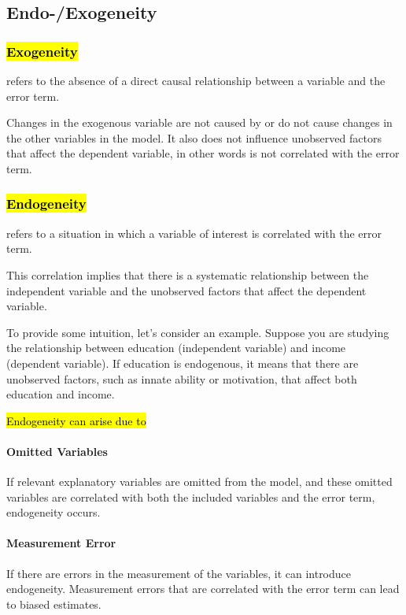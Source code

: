 \documentclass[a3paper, 8pt]{extarticle}
\begin{document}
\begin{multicols*}{5}
\subsection{Endo-/Exogeneity}


\subsubsection{\hl{Exogeneity}}
 refers to the absence of a direct causal relationship between a variable and the error term.

Changes in the exogenous variable are not caused by or do not cause changes in the other variables in the model. It also does not influence unobserved factors that affect the dependent variable, in other words is not correlated with the error term.

\subsubsection{\hl{Endogeneity}} refers to a situation in which a variable of interest is correlated with the error term.

This correlation implies that there is a systematic relationship between the independent variable and the unobserved factors that affect the dependent variable.

To provide some intuition, let's consider an example. Suppose you are studying the relationship between education (independent variable) and income (dependent variable). If education is endogenous, it means that there are unobserved factors, such as innate ability or motivation, that affect both education and income.

\hl{Endogeneity can arise due to} 

\paragraph{Omitted Variables} If relevant explanatory variables are omitted from the model, and these omitted variables are correlated with both the included variables and the error term, endogeneity occurs.

\paragraph{Measurement Error} If there are errors in the measurement of the variables, it can introduce endogeneity. Measurement errors that are correlated with the error term can lead to biased estimates.


\end{multicols*}
\end{document}
